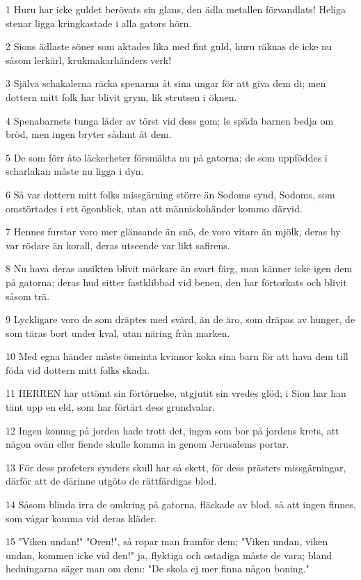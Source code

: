 \par 1 Huru har icke guldet berövats sin glans, den ädla metallen förvandlats! Heliga stenar ligga kringkastade i alla gators hörn.
\par 2 Sions ädlaste söner som aktades lika med fint guld, huru räknas de icke nu såsom lerkärl, krukmakarhänders verk!
\par 3 Själva schakalerna räcka spenarna åt sina ungar för att giva dem di; men dottern mitt folk har blivit grym, lik strutsen i öknen.
\par 4 Spenabarnets tunga låder av törst vid dess gom; le späda barnen bedja om bröd, men ingen bryter sådant åt dem.
\par 5 De som förr åto läckerheter försmäkta nu på gatorna; de som uppföddes i scharlakan måste nu ligga i dyn.
\par 6 Så var dottern mitt folks missgärning större än Sodoms synd, Sodoms, som omstörtades i ett ögonblick, utan att människohänder kommo därvid.
\par 7 Hennes furstar voro mer glänsande än snö, de voro vitare än mjölk, deras hy var rödare än korall, deras utseende var likt safirens.
\par 8 Nu hava deras ansikten blivit mörkare än svart färg, man känner icke igen dem på gatorna; deras hud sitter fastklibbad vid benen, den har förtorkats och blivit såsom trä.
\par 9 Lyckligare voro de som dräptes med svärd, än de äro, som dräpas av hunger, de som täras bort under kval, utan näring från marken.
\par 10 Med egna händer måste ömsinta kvinnor koka sina barn för att hava dem till föda vid dottern mitt folks skada.
\par 11 HERREN har uttömt sin förtörnelse, utgjutit sin vredes glöd; i Sion har han tänt upp en eld, som har förtärt dess grundvalar.
\par 12 Ingen konung på jorden hade trott det, ingen som bor på jordens krets, att någon ovän eller fiende skulle komma in genom Jerusalems portar.
\par 13 För dess profeters synders skull har så skett, för dess prästers missgärningar, därför att de därinne utgöto de rättfärdigas blod.
\par 14 Såsom blinda irra de omkring på gatorna, fläckade av blod. så att ingen finnes, som vågar komma vid deras kläder.
\par 15 "Viken undan!" "Oren!", så ropar man framför dem; "Viken undan, viken undan, kommen icke vid den!" ja, flyktiga och ostadiga måste de vara; bland hedningarna säger man om dem: "De skola ej mer finna någon boning."
